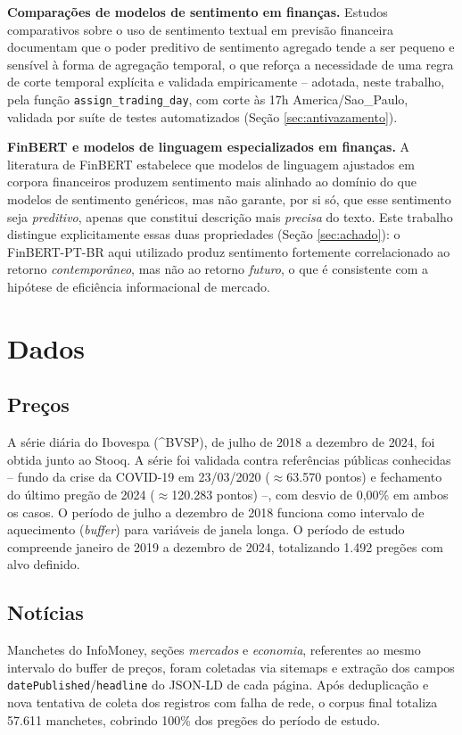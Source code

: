 \documentclass[conference]{IEEEtran}
\begin{document}
\textbf{Compara\c{c}\~oes de modelos de sentimento em finan\c{c}as.} Estudos comparativos sobre o uso de sentimento textual em previs\~ao financeira \cite{dahal2023comparative} documentam que o poder preditivo de sentimento agregado tende a ser pequeno e sens\'ivel \`a forma de agrega\c{c}\~ao temporal, o que refor\c{c}a a necessidade de uma regra de corte temporal expl\'icita e validada empiricamente -- adotada, neste trabalho, pela fun\c{c}\~ao \texttt{assign\_trading\_day}, com corte \`as 17h America/Sao\_Paulo, validada por su\'ite de testes automatizados (Se\c{c}\~ao \ref{sec:antivazamento}).

\textbf{FinBERT e modelos de linguagem especializados em finan\c{c}as.} A literatura de FinBERT \cite{araci2019finbert} estabelece que modelos de linguagem ajustados em corpora financeiros produzem sentimento mais alinhado ao dom\'inio do que modelos de sentimento gen\'ericos, mas n\~ao garante, por si s\'o, que esse sentimento seja \emph{preditivo}, apenas que constitui descri\c{c}\~ao mais \emph{precisa} do texto. Este trabalho distingue explicitamente essas duas propriedades (Se\c{c}\~ao \ref{sec:achado}): o FinBERT-PT-BR aqui utilizado produz sentimento fortemente correlacionado ao retorno \emph{contempor\^aneo}, mas n\~ao ao retorno \emph{futuro}, o que \'e consistente com a hip\'otese de efici\^encia informacional de mercado.

\section{Dados}

\subsection{Pre\c{c}os}
A s\'erie di\'aria do Ibovespa (\^{}BVSP), de julho de 2018 a dezembro de 2024, foi obtida junto ao Stooq. A s\'erie foi validada contra refer\^encias p\'ublicas conhecidas -- fundo da crise da COVID-19 em 23/03/2020 ($\approx$63.570 pontos) e fechamento do \'ultimo preg\~ao de 2024 ($\approx$120.283 pontos) --, com desvio de 0,00\% em ambos os casos. O per\'iodo de julho a dezembro de 2018 funciona como intervalo de aquecimento (\emph{buffer}) para vari\'aveis de janela longa. O per\'iodo de estudo compreende janeiro de 2019 a dezembro de 2024, totalizando 1.492 preg\~oes com alvo definido.

\subsection{Not\'icias}
Manchetes do InfoMoney, se\c{c}\~oes \emph{mercados} e \emph{economia}, referentes ao mesmo intervalo do buffer de pre\c{c}os, foram coletadas via sitemaps e extra\c{c}\~ao dos campos \texttt{datePublished}/\texttt{headline} do JSON-LD de cada p\'agina. Ap\'os deduplica\c{c}\~ao e nova tentativa de coleta dos registros com falha de rede, o corpus final totaliza 57.611 manchetes, cobrindo 100\% dos preg\~oes do per\'iodo de estudo.
\end{document}
